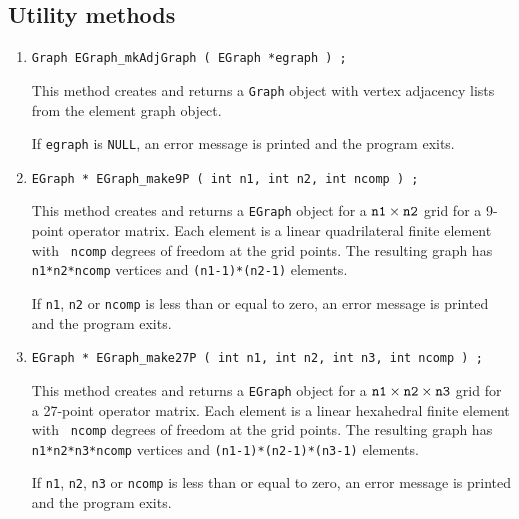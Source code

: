 \subsection{Utility methods}
\label{subsection:EGraph:proto:utilities}
\par
\begin{enumerate}
\item
\begin{verbatim}
Graph EGraph_mkAdjGraph ( EGraph *egraph ) ;
\end{verbatim}
This method creates and returns a {\tt Graph} object 
with vertex adjacency lists from the element graph object.
\par {}
If {\tt egraph} is {\tt NULL},
an error message is printed and the program exits.
\item
\begin{verbatim}
EGraph * EGraph_make9P ( int n1, int n2, int ncomp ) ;
\end{verbatim}
This method creates and returns a {\tt EGraph} object 
for a $\mbox{\tt n1} \times \mbox{\tt n2}$ grid for a 9-point
operator matrix.
Each element is a linear quadrilateral finite element with {\tt
ncomp} degrees of freedom at the grid points.
The resulting graph has {\tt n1*n2*ncomp} vertices and
{\tt (n1-1)*(n2-1)} elements.
\par {}
If {\tt n1}, {\tt n2} or {\tt ncomp} is less than or equal to zero,
an error message is printed and the program exits.
\item
\begin{verbatim}
EGraph * EGraph_make27P ( int n1, int n2, int n3, int ncomp ) ;
\end{verbatim}
This method creates and returns a {\tt EGraph} object 
for a $\mbox{\tt n1} \times \mbox{\tt n2} \times \mbox{\tt n3}$ grid 
for a 27-point operator matrix.
Each element is a linear hexahedral finite element with {\tt
ncomp} degrees of freedom at the grid points.
The resulting graph has {\tt n1*n2*n3*ncomp} vertices and
{\tt (n1-1)*(n2-1)*(n3-1)} elements.
\par {}
If {\tt n1}, {\tt n2}, {\tt n3} or {\tt ncomp} 
is less than or equal to zero,
an error message is printed and the program exits.
\end{enumerate}
\par

